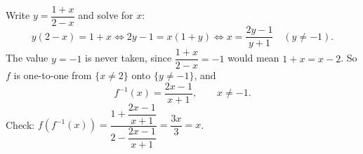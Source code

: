 Write $y=\dfrac{1+x}{2-x}$ and solve for $x$:
\[
y(2-x)=1+x\iff2y-1=x(1+y)\iff x=\dfrac{2y-1}{y+1}\quad(y\ne-1).
\]
The value $y=-1$ is never taken, since $\dfrac{1+x}{2-x}=-1$ would mean $1+x=x-2$. So $f$ is one-to-one from $\{x\ne2\}$ onto $\{y\ne-1\}$, and
\[
\boxed{f^{-1}(x)=\dfrac{2x-1}{x+1}},\qquad x\ne-1 .
\]
Check: $f\left(f^{-1}(x)\right)=\dfrac{1+\dfrac{2x-1}{x+1}}{2-\dfrac{2x-1}{x+1}}=\dfrac{3x}{3}=x$.
